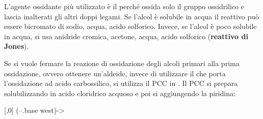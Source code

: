 L'agente ossidante più utilizzato è il  perché ossida solo il gruppo ossidrilico e lascia inalterati gli altri doppi legami. Se l'alcol è solubile in acqua il reattivo può essere bicromato di sodio, acqua, acido solforico. Invece, se l’alcol è poco solubile in acqua, si usa anidride cromica, acetone, acqua, acido solforico (\textbf{reattivo di Jones}).

Se si vuole fermare la reazione di ossidazione degli alcoli primari alla prima ossidazione, ovvero ottenere un'aldeide, invece di utilizzare il  che porta l'ossidazione ad acido carbossilico, si utilizza il \ac{PCC} in . Il \ac*{PCC} si prepara solubilizzando  in acido cloridrico acquoso e poi si aggiungendo la piridina:
\begin{reaction}
	 \+  \+ [,0] 
	\arrow(--.base west){->}
\end{reaction}
